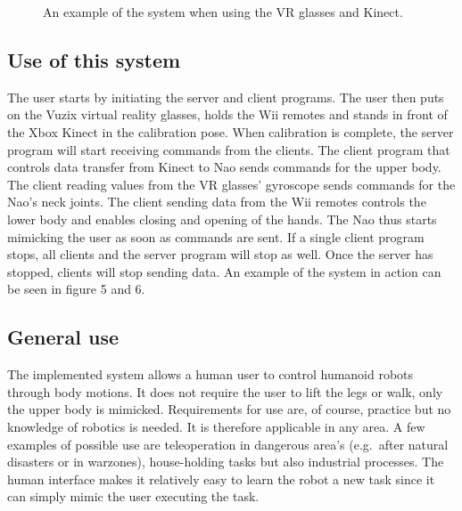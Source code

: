 \documentclass[letterpaper, 10pt, conference]{ieeeconf}
\begin{document}
\begin{figure}[ht]
\label{Duncan}
\caption{An example of the system when using the VR glasses and Kinect.}
\end{figure}

\subsection{Use of this system}
The user starts by initiating the server and client programs. The user then puts on the Vuzix virtual reality glasses, holds the Wii remotes and stands in front of the Xbox Kinect in the calibration pose. When calibration is complete, the server program will start receiving commands from the clients. The client program that controls data transfer from Kinect to Nao sends commands for the upper body. The client reading values from the VR glasses’ gyroscope sends commands for the Nao’s neck joints. The client sending data from the Wii remotes controls the lower body and enables closing and opening of the hands. 
The Nao thus starts mimicking the user as soon as commands are sent. If a single client program stops, all clients and the server program will stop as well. Once the server has stopped, clients will stop sending data. 
An example of the system in action can be seen in figure 5 and 6.

\subsection{General use}
The implemented system allows a human user to control humanoid robots through body motions. It does not require the user to lift the legs or walk, only the upper body is mimicked. Requirements for use are, of course, practice but no knowledge of robotics is needed. It is therefore applicable in any area. A few examples of possible use are teleoperation in dangerous area’s (e.g.\ after natural disasters or in warzones), house-holding tasks but also industrial processes. The human interface makes it relatively easy to learn the robot a new task since it can simply mimic the user executing the task. 
\end{document}
